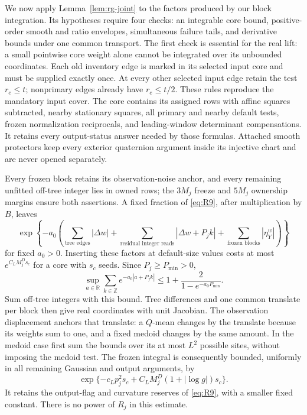 We now apply Lemma~\ref{lem:rg-joint} to the factors produced by our block
integration.  Its hypotheses require four checks: an integrable core
bound, positive-order smooth and ratio envelopes, simultaneous failure
tails, and derivative bounds under one common transport.  The first check
is essential for the real lift: a small pointwise core weight alone
cannot be integrated over its unbounded coordinates.
Each old inventory edge is marked in its selected input core and must
be supplied exactly once.  At every other selected input edge retain
the test $r_e\le t$; nonprimary edges already have $r_e\le t/2$.
These rules reproduce the mandatory input cover.  The core contains its
assigned rows with affine squares subtracted, nearby stationary
squares, all primary and nearby default tests, frozen normalization
reciprocals, and leading-window determinant compensations.  It retains
every output-status answer needed by those formulas.  Attached smooth
protectors keep every exterior quaternion argument inside its injective
chart and are never opened separately.

Every frozen block retains its observation-noise anchor, and every
remaining unfitted off-tree integer lies in owned rows; the $3M_j$
freeze and $5M_j$ ownership margins ensure both assertions.  A fixed
fraction of \eqref{eq:R9}, after multiplication by $B$, leaves
\[
 \exp\!\left\{-a_0\left(
    \sum_{\text{tree edges}}|\Delta w|+
    \sum_{\text{residual integer reads}}|\Delta w+P_jk|
       +\sum_{\text{frozen blocks}}|\eta_Y^w|\right)\right\}
\]
for fixed $a_0>0$.  Inserting these factors at default-size values costs
at most $e^{C_LM_j^Ds_c}$ for a core with $s_c$ seeds.  Since
$P_j\ge P_{\min}>0$,
\[
 \sup_{a\in\mathbb R}\sum_{k\in\mathbb Z}
             e^{-a_0|a+P_jk|}
 \le 1+\frac{2}{1-e^{-a_0P_{\min}}}.
\]
Sum off-tree integers with this bound.  Tree differences and one common
translate per block then give real coordinates with unit Jacobian.
The observation displacement anchors that translate: a $Q$-mean changes
by the translate because its weights sum to one, and a fixed medoid
changes by the same amount.  In the medoid case first sum the bounds
over its at most $L^2$ possible sites, without imposing the medoid
test.  The frozen integral is consequently bounded, uniformly in all
remaining Gaussian and output arguments, by
\begin{equation}
       \exp\{-c_Lp_j^2s_c+C_LM_j^D(1+|\log g|)s_c\}.
 \label{eq:rg-frozen-entropy}
\end{equation}
It retains the output-flag and curvature reserves of
\eqref{eq:R9}, with a smaller fixed constant.  There is no power of
$R_j$ in this estimate.

